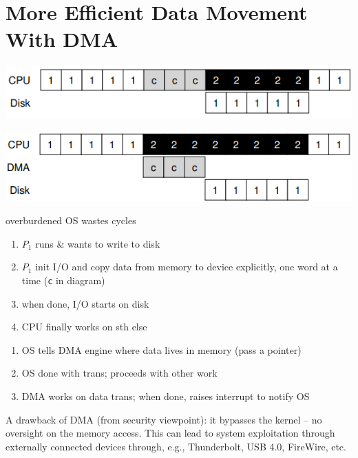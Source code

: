 \section*{More Efficient Data Movement With DMA}
\begin{minipage}{.5\linewidth}
  \includegraphics[width=\linewidth]{imgs/dma1}
\end{minipage}
\begin{minipage}{.5\linewidth}
  \includegraphics[width=\linewidth]{imgs/dma2}
\end{minipage}
\begin{minipage}{.5\linewidth}
  \flushleft
   overburdened OS wastes cycles
  \begin{enumerate}
  \item $P_1$ runs \& wants to write to disk
  \item $P_1$ init I/O and copy data from memory to device explicitly, one word at a time (\texttt{c} in diagram)
  \item when done, I/O starts on disk
  \item CPU finally works on sth else
  \end{enumerate}
\end{minipage}
\begin{minipage}{.5\linewidth}
  \flushleft
  \begin{enumerate}
  \item OS tells DMA engine where data lives in memory (pass a pointer)
  \item OS done with trans; proceeds with other work
  \item DMA works on data trans; when done, raises interrupt to notify OS
  \end{enumerate}
\end{minipage}
\begin{tcolorbox}[left=0mm, top=1mm, right=0mm, rightlower=0mm, bottom=1mm,
  title= DMA Attack,
  halign title=center]
  A drawback of DMA (from security viewpoint): it bypasses the kernel -- no oversight on the memory access. This can lead to system exploitation through externally connected devices through, e.g., Thunderbolt, USB 4.0, FireWire, etc.
\end{tcolorbox}


